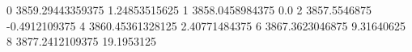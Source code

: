 0 3859.29443359375 1.24853515625
1 3858.0458984375 0.0
2 3857.5546875 -0.4912109375
4 3860.45361328125 2.40771484375
6 3867.3623046875 9.31640625
8 3877.2412109375 19.1953125

